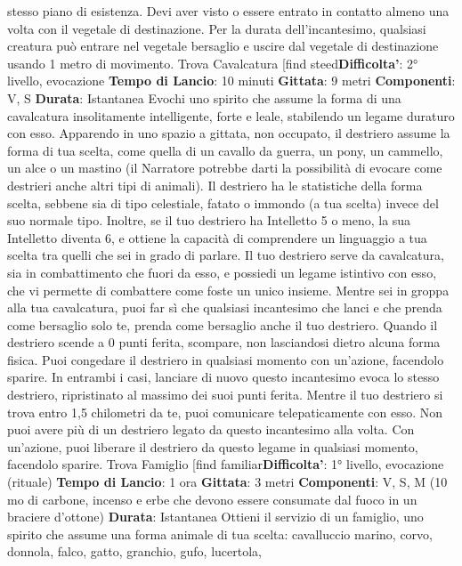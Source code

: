 \begin{multicols}{2}
stesso piano di esistenza. Devi aver visto o essere
entrato in contatto almeno una volta con il vegetale di
destinazione. Per la durata dell’incantesimo, qualsiasi
creatura può entrare nel vegetale bersaglio e uscire dal
vegetale di destinazione usando 1 metro di
movimento.
Trova Cavalcatura
[find steed\textbf{Difficolta'}:
2° livello, evocazione
\textbf{Tempo di Lancio}: 10 minuti
\textbf{Gittata}: 9 metri
\textbf{Componenti}: V, S
\textbf{Durata}: Istantanea
Evochi uno spirito che assume la forma di una
cavalcatura insolitamente intelligente, forte e leale,
stabilendo un legame duraturo con esso. Apparendo in
uno spazio a gittata, non occupato, il destriero assume
la forma di tua scelta, come quella di un cavallo da
guerra, un pony, un cammello, un alce o un mastino (il
Narratore potrebbe darti la possibilità di evocare come
destrieri anche altri tipi di animali). Il destriero ha le
statistiche della forma scelta, sebbene sia di tipo
celestiale, fatato o immondo (a tua scelta) invece del
suo normale tipo. Inoltre, se il tuo destriero ha
Intelletto 5 o meno, la sua Intelletto diventa 6, e
ottiene la capacità di comprendere un linguaggio a tua
scelta tra quelli che sei in grado di parlare.
Il tuo destriero serve da cavalcatura, sia in
combattimento che fuori da esso, e possiedi un legame
istintivo con esso, che vi permette di combattere come
foste un unico insieme. Mentre sei in groppa alla tua
cavalcatura, puoi far sì che qualsiasi incantesimo che
lanci e che prenda come bersaglio solo te, prenda
come bersaglio anche il tuo destriero.
Quando il destriero scende a 0 punti ferita, scompare,
non lasciandosi dietro alcuna forma fisica. Puoi
congedare il destriero in qualsiasi momento con
un’azione, facendolo sparire. In entrambi i casi, lanciare
di nuovo questo incantesimo evoca lo stesso destriero,
ripristinato al massimo dei suoi punti ferita.
Mentre il tuo destriero si trova entro 1,5 chilometri da te,
puoi comunicare telepaticamente con esso.
Non puoi avere più di un destriero legato da questo
incantesimo alla volta. Con un’azione, puoi liberare il
destriero da questo legame in qualsiasi momento,
facendolo sparire.
Trova Famiglio
[find familiar\textbf{Difficolta'}:
1° livello, evocazione (rituale)
\textbf{Tempo di Lancio}: 1 ora
\textbf{Gittata}: 3 metri
\textbf{Componenti}: V, S, M (10 mo di carbone, incenso e
erbe che devono essere consumate dal fuoco in un
braciere d’ottone)
\textbf{Durata}: Istantanea
Ottieni il servizio di un famiglio, uno spirito che assume
una forma animale di tua scelta: cavalluccio marino,
corvo, donnola, falco, gatto, granchio, gufo, lucertola,

\end{multicols}
